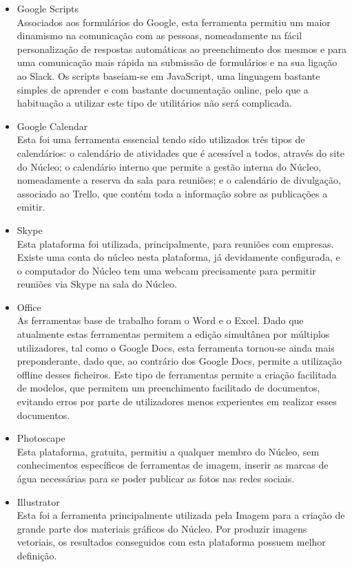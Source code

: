\begin{itemize}
\item Google Scripts\\
Associados aos formulários do Google, esta ferramenta permitiu um maior dinamismo na comunicação com as pessoas, nomeadamente na fácil personalização de respostas automáticas ao preenchimento dos mesmos e para uma comunicação mais rápida na submissão de formulários e na sua ligação ao Slack. Os scripts baseiam-se em JavaScript, uma linguagem bastante simples de aprender e com bastante documentação online, pelo que a habituação a utilizar este tipo de utilitários não será complicada.

\item Google Calendar\\
Esta foi uma ferramenta essencial tendo sido utilizados três tipos de calendários: o calendário de atividades que é acessível a todos, através do site do Núcleo; o calendário interno que permite a gestão interna do Núcleo, nomeadamente a reserva da sala para reuniões; e o calendário de divulgação, associado ao Trello, que contém toda a informação sobre as publicações a emitir.

\item Skype\\
Esta plataforma foi utilizada, principalmente, para reuniões com empresas. Existe uma conta do núcleo nesta plataforma, já devidamente configurada, e o computador do Núcleo tem uma webcam precisamente para permitir reuniões via Skype na sala do Núcleo.

\item Office\\
As ferramentas base de trabalho foram o Word e o Excel. Dado que atualmente estas ferramentas permitem a edição simultânea por múltiplos utilizadores, tal como o Google Docs, esta ferramenta tornou-se ainda mais preponderante, dado que, ao contrário dos Google Docs, permite a utilização offline desses ficheiros. Este tipo de ferramentas permite a criação facilitada de modelos, que permitem um preenchimento facilitado de documentos, evitando erros por parte de utilizadores menos experientes em realizar esses documentos.

\item Photoscape\\
Esta plataforma, gratuita, permitiu a qualquer membro do Núcleo, sem conhecimentos específicos de ferramentas de imagem, inserir as marcas de água necessárias para se poder publicar as fotos nas redes sociais.

\item Illustrator\\
Esta foi a ferramenta principalmente utilizada pela Imagem para a criação de grande parte dos materiais gráficos do Núcleo. Por produzir imagens vetoriais, os resultados conseguidos com esta plataforma possuem melhor definição.


\end{itemize}
